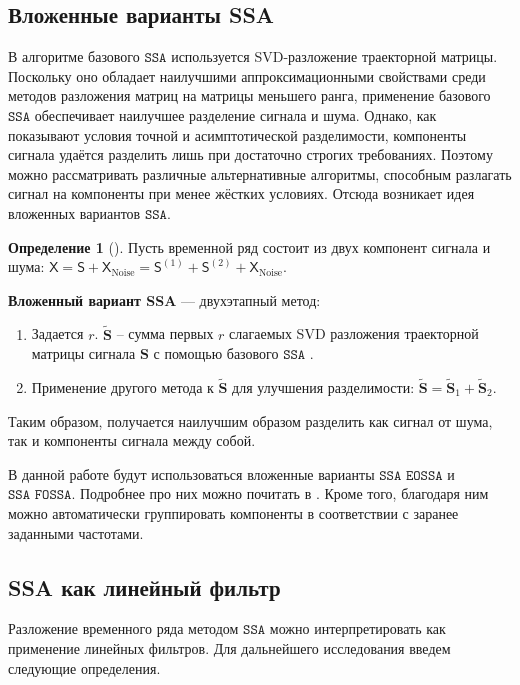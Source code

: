 \documentclass[12pt, specialist, subf
]{disser}
\theoremstyle{definition}
\newcommand{\SSA}{\texttt{SSA}}
\newcommand{\EOSSA}{\texttt{SSA EOSSA}}
\newcommand{\FOSSA}{\texttt{SSA FOSSA}}
\newcommand{\TS}{\mathsf{X}}
\newtheorem{definition}{Определение} %
\begin{document}
\subsection{Вложенные варианты SSA}
\label{sec:eossa_and_autogroup}

В алгоритме базового $\SSA$ используется SVD-разложение траекторной матрицы. Поскольку оно обладает наилучшими аппроксимационными свойствами среди методов разложения матриц на матрицы меньшего ранга, применение базового $\SSA$ обеспечивает наилучшее разделение сигнала и шума. Однако, как показывают условия точной и асимптотической разделимости, компоненты сигнала удаётся разделить лишь при достаточно строгих требованиях. Поэтому можно рассматривать различные альтернативные алгоритмы, способным разлагать сигнал на компоненты при менее жёстких условиях.
Отсюда возникает идея вложенных вариантов $\SSA$.

\begin{definition}[\cite{Golyandina_2015}]

	Пусть временной ряд состоит из двух компонент сигнала и шума: $\TS = \mathsf{S} + \TS_{\mathrm{Noise}}=
		\mathsf{S}^{(1)} + \mathsf{S}^{(2)} + \TS_{\mathrm{Noise}}$.

	\textbf{Вложенный вариант SSA} — двухэтапный метод:
	\begin{enumerate}
		\item Задается $r$. $\tilde {\mathbf{S}}$ -- сумма первых $r$ слагаемых SVD разложения траекторной матрицы сигнала $\mathbf S$ с помощью базового $\SSA$ .
		\item Применение другого метода к $\tilde{\mathbf{S}}$ для улучшения разделимости: $\tilde{\mathbf{S }} = \tilde{\mathbf{S}}_1 + \tilde{\mathbf{S } }_2$.
	\end{enumerate}
\end{definition}


Таким образом, получается наилучшим образом разделить как сигнал от шума, так и компоненты сигнала между собой.

В данной работе будут использоваться вложенные варианты $\EOSSA$ и $\FOSSA$. Подробнее про них можно почитать в \cite{golyandina2023intelligent}. Кроме того, благодаря ним можно автоматически группировать компоненты в соответствии с заранее заданными частотами.



\subsection{SSA как линейный фильтр}
Разложение временного ряда методом $\SSA$ можно интерпретировать как применение линейных фильтров. Для дальнейшего исследования введем следующие определения.
\end{document}
